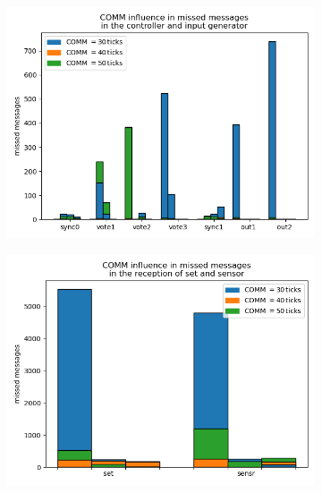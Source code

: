 \documentclass[table,xcdraw]{article}
\begin{document}
\begin{figure}[h!]
     \centering
     \begin{subfigure}[b]{0.8\textwidth}
         \centering
         \includegraphics[width=\textwidth]{figures/missing_msgs/missed_msgs_COMM_ctrl.png}
         \caption{}
     \end{subfigure}
     \hfill
     \begin{subfigure}[b]{0.4\textwidth}
         \centering
         \includegraphics[width=\textwidth]{figures/missing_msgs/missed_msgs_COMM_set_sensr.png}
         \caption{}
     \end{subfigure}
     \hfill
     \begin{subfigure}[b]{0.4\textwidth}
         \centering

\end{subfigure}
\end{figure}
\end{document}
